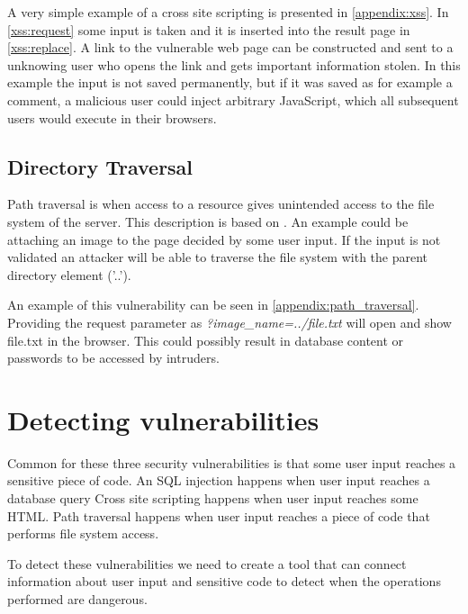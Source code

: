 A very simple example of a cross site scripting is presented in \cref{appendix:xss}.
In \cref{xss:request} some input is taken and it is inserted into the result page in \cref{xss:replace}.
A link to the vulnerable web page can be constructed and sent to a unknowing user who opens the link and gets important information stolen.
In this example the input is not saved permanently, but if it was saved as for example a comment, a malicious user could inject arbitrary JavaScript, which all subsequent users would execute in their browsers.

\subsection{Directory Traversal}\label{vulnerabilities:traversal}
Path traversal is when access to a resource gives unintended access to the file system of the server.
This description is based on \citet{pathtraversal}.
An example could be attaching an image to the page decided by some user input.
If the input is not validated an attacker will be able to traverse the file system with the parent directory element ('..'). 

An example of this vulnerability can be seen in \cref{appendix:path_traversal}.
Providing the request parameter as \emph{?image\_name=../file.txt} will open and show file.txt in the browser.
This could possibly result in database content or passwords to be accessed by intruders.

\section{Detecting vulnerabilities}\label{vulnerabilities:detecting}
Common for these three security vulnerabilities is that some user input reaches a sensitive piece of code.
An SQL injection happens when user input reaches a database query
Cross site scripting happens when user input reaches some HTML.
Path traversal happens when user input reaches a piece of code that performs file system access.

To detect these vulnerabilities we need to create a tool that can connect information about user input and sensitive code to detect when the operations performed are dangerous.
